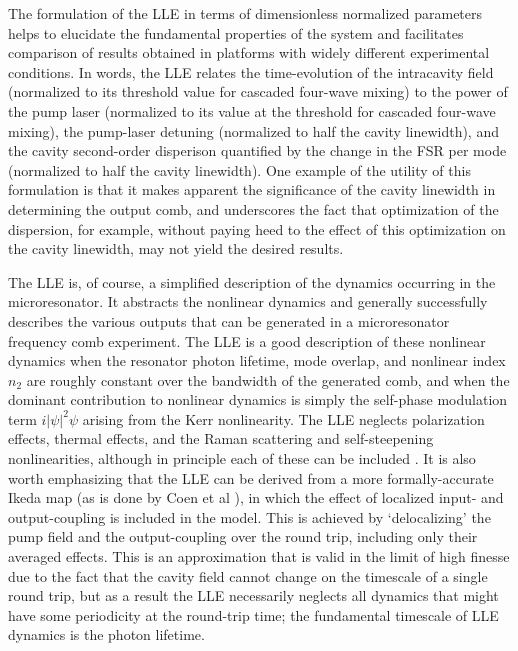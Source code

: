 The formulation of the LLE in terms of dimensionless normalized parameters helps to elucidate the fundamental properties of the system and facilitates comparison of results obtained in platforms with widely different experimental conditions. In words, the LLE relates the time-evolution of the intracavity field (normalized to its threshold value for cascaded four-wave mixing) to the power of the pump laser (normalized to its value at the threshold for cascaded four-wave mixing), the pump-laser detuning (normalized to half the cavity linewidth), and the cavity second-order disperison quantified by the change in the FSR per mode (normalized to half the cavity linewidth). One example of the utility of this formulation is that it makes apparent the significance of the cavity linewidth in determining the output comb, and underscores the fact that optimization of the dispersion, for example, without paying heed to the effect of this optimization on the cavity linewidth, may not yield the desired results.

The LLE is, of course, a simplified description of the dynamics occurring in the microresonator. It abstracts the nonlinear dynamics and generally successfully describes the various outputs that can be generated in a microresonator frequency comb experiment. The LLE is a good description of these nonlinear dynamics when the resonator photon lifetime, mode overlap, and nonlinear index $n_2$ are roughly constant over the bandwidth of the generated comb, and when the dominant contribution to nonlinear dynamics is simply the self-phase modulation term $i|\psi|^2\psi$ arising from the Kerr nonlinearity. The LLE neglects polarization effects, thermal effects, and the Raman scattering and self-steepening nonlinearities, although in principle each of these can be included \cite{Hansson2018,Herr2014,Chembo2015,Agrawal2007}. It is also worth emphasizing that the LLE can be derived from a more formally-accurate Ikeda map (as is done by Coen et al \cite{Coen2013a}), in which the effect of localized input- and output-coupling is included in the model. This is achieved by `delocalizing' the pump field and the output-coupling over the round trip, including only their averaged effects. This is an approximation that is valid in the limit of high finesse due to the fact that the cavity field cannot change on the timescale of a single round trip, but as a result the LLE necessarily neglects all dynamics that might have some periodicity at the round-trip time; the fundamental timescale of LLE dynamics is the photon lifetime. 

